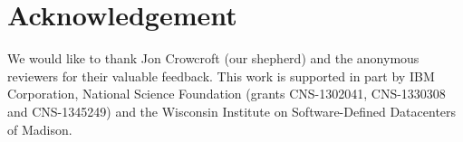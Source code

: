 \documentclass[10pt]{sig-alternate-05-2015}
\begin{document}






%
%

%
%
\printccsdesc


\keywords{Load Balancing; Software-Defined Networking; %
}







%


\section*{Acknowledgement}

We would like to thank Jon Crowcroft (our shepherd) and
the anonymous reviewers for their valuable feedback. This
work is supported in part by IBM Corporation, National
Science Foundation (grants CNS-1302041, CNS-1330308
and CNS-1345249) and the Wisconsin Institute on Software-Defined Datacenters of Madison.
{
\small
\setlength{\bibsep}{0.5pt}
\raggedright
\balance


}
\end{document}
